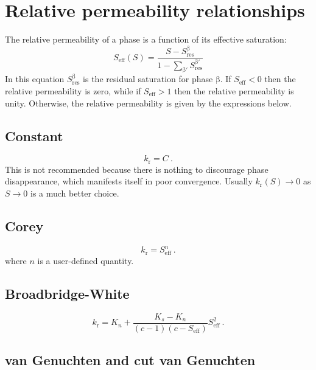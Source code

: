 \documentclass[12pt]{report}
\def\phase{\mathrm{\beta}}
\begin{document}
\section{Relative permeability relationships}

The relative permeability of a phase is a function of its effective
saturation:
\begin{equation}
S_{\mathrm{eff}}(S) = \frac{S - S_{\mathrm{res}}^{\phase}}{1 -
  \sum_{\phase'}S_{\mathrm{res}}^{\phase'}}
\end{equation}
In this equation $S_{\mathrm{res}}^{\phase}$ is the residual
saturation for phase $\phase$.  If $S_{\mathrm{eff}} < 0$ then the
relative permeability is zero, while if $S_{\mathrm{eff}}>1$ then the
relative permeability is unity.  Otherwise, the relative permeability
is given by the expressions below.

\subsection{Constant}

\begin{equation}
k_{\mathrm{r}} = C \ .
\end{equation}
This is not recommended because there is nothing to discourage phase
disappearance, which manifests itself in poor convergence.  Usually
$k_{\mathrm{r}}(S) \rightarrow 0$ as $S\rightarrow 0$ is a much better
choice.

\subsection{Corey}

\begin{equation}
k_{\mathrm{r}} = S_{\mathrm{eff}}^{n} \ .
\end{equation}
where $n$ is a user-defined quantity.

\subsection{Broadbridge-White}

\begin{equation}
k_{\mathrm{r}} = K_{n} + \frac{K_{s} - K_{n}}{(c - 1)(c -
  S_{\mathrm{eff}})}S_{\mathrm{eff}}^{2} \ .
\end{equation}

\subsection{van Genuchten and cut van Genuchten}
\end{document}
